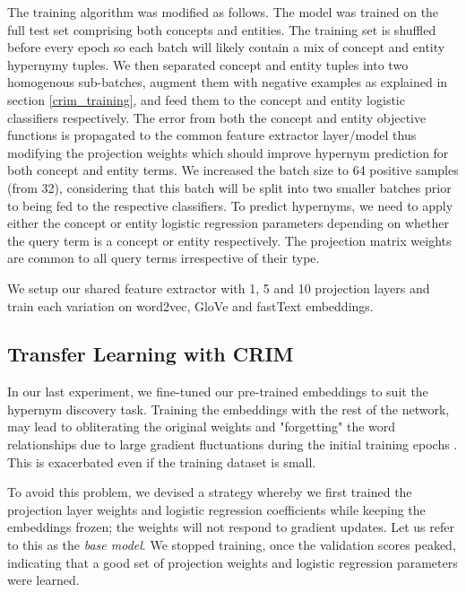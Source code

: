The training algorithm was modified as follows.  The model was trained on the full test set comprising both concepts and entities.  The training set is shuffled before every epoch so each batch will likely contain a mix of concept and entity hypernymy tuples.  We then separated concept and entity tuples into two homogenous sub-batches, augment them with negative examples as explained in section \ref{crim_training}, and feed them to the concept and entity logistic classifiers respectively.  The error from both the concept and entity objective functions is propagated to the common feature extractor layer/model thus modifying the projection weights which should improve hypernym prediction for both concept and entity terms.  We increased the batch size to 64 positive samples (from 32), considering that this batch will be split into two smaller batches prior to being fed to the respective classifiers.  To predict hypernyms, we need to apply either the concept or entity logistic regression parameters depending on whether the query term is a concept or entity respectively.  The projection matrix weights are common to all query terms irrespective of their type.

We setup our shared feature extractor with 1, 5 and 10 projection layers and train each variation on word2vec, GloVe and fastText embeddings.

\subsection{Transfer Learning with CRIM}
In our last experiment, we fine-tuned our pre-trained embeddings to suit the hypernym discovery task.  Training the embeddings with the rest of the network, may lead to obliterating the original weights and "forgetting" the word relationships due to large gradient fluctuations during the initial training epochs \citep{howard2018universal}.  This is exacerbated even if the training dataset is small.

To avoid this problem, we devised a strategy whereby we first trained the projection layer weights and logistic regression coefficients while keeping the embeddings frozen; the weights will not respond to gradient updates.  Let us refer to this as the \textit{base model}.  We stopped training, once the validation scores peaked, indicating that a good set of projection weights and logistic regression parameters were learned.  

